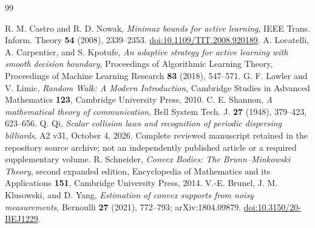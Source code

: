\begin{thebibliography}{99}
\raggedright
{}
R. M. Castro and R. D. Nowak, \emph{Minimax bounds for active learning},
IEEE Trans. Inform. Theory \textbf{54} (2008), 2339--2353.
\href{https://doi.org/10.1109/TIT.2008.920189}{doi:10.1109/TIT.2008.920189}.
A. Locatelli, A. Carpentier, and S. Kpotufe,
\emph{An adaptive strategy for active learning with smooth decision boundary},
Proceedings of Algorithmic Learning Theory, Proceedings of Machine
Learning Research \textbf{83} (2018), 547--571.
G. F. Lawler and V. Limic, \emph{Random Walk: A Modern Introduction},
Cambridge Studies in Advanced Mathematics \textbf{123}, Cambridge
University Press, 2010.
C. E. Shannon, \emph{A mathematical theory of communication},
Bell System Tech. J. \textbf{27} (1948), 379--423, 623--656.
Q. Qi, \emph{Scalar collision laws and recognition of periodic dispersing
billiards}, A2 v31, October 4, 2026. Complete reviewed manuscript retained in the repository source archive;
not an independently published article or a required supplementary volume.
R. Schneider, \emph{Convex Bodies: The Brunn--Minkowski Theory},
second expanded edition, Encyclopedia of Mathematics and its Applications
\textbf{151}, Cambridge University Press, 2014.
V.-E. Brunel, J. M. Klusowski, and D. Yang,
\emph{Estimation of convex supports from noisy measurements},
Bernoulli \textbf{27} (2021), 772--793; arXiv:1804.09879.
\href{https://doi.org/10.3150/20-BEJ1229}{doi:10.3150/20-BEJ1229}.
\end{thebibliography}
